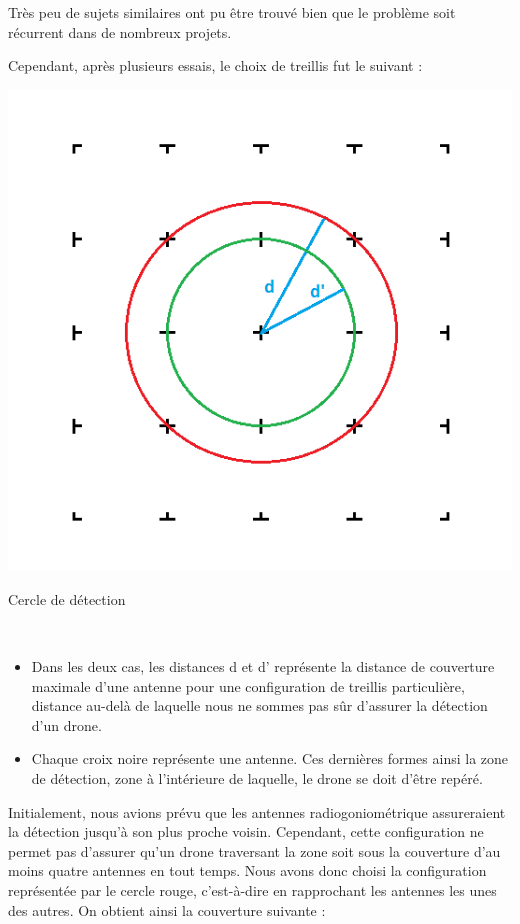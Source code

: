 Très peu de sujets similaires ont pu être trouvé bien que le problème soit récurrent dans de
nombreux projets.

Cependant, après plusieurs essais, le choix de treillis fut le suivant :

\begin{minipage}{0.45\linewidth}

  \centering
  \includegraphics[width=\textwidth]{treillis_explication}
  \caption{Cercle de détection}
  ~\\
\end{minipage}
\begin{minipage}{0.45\linewidth}
  \begin{itemize}
  \item Dans les deux cas, les distances d et d’ représente la distance de couverture maximale d’une antenne pour une configuration de treillis particulière, distance au-delà de laquelle nous ne sommes pas sûr d’assurer la détection d’un drone.
  \item Chaque croix noire représente une antenne. Ces dernières formes ainsi la zone de détection, zone à l’intérieure de laquelle, le drone se doit d’être repéré.
  \end{itemize}
\end{minipage}


Initialement, nous avions prévu que les antennes radiogoniométrique assureraient la détection
jusqu’à son plus proche voisin. Cependant, cette configuration ne permet pas d’assurer qu’un drone
traversant la zone soit sous la couverture d’au moins quatre antennes en tout temps. Nous avons
donc choisi la configuration représentée par le cercle rouge, c’est-à-dire en rapprochant les antennes
les unes des autres. On obtient ainsi la couverture suivante :
~\\

